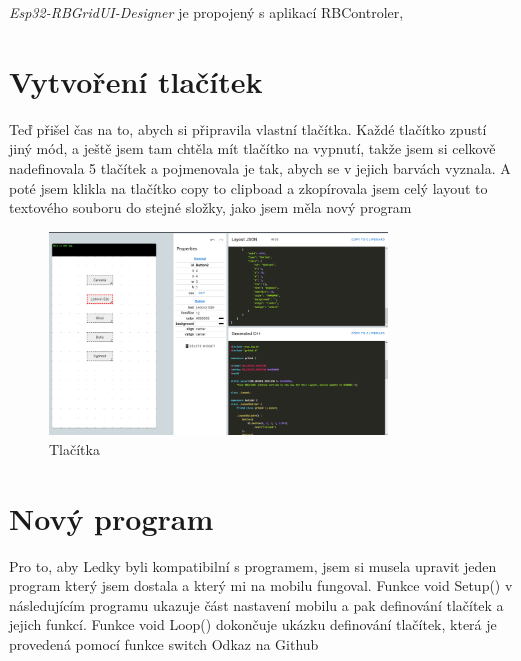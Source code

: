 {\em Esp32-RBGridUI-Designer} je propojený s aplikací RBControler, %

\section{Vytvoření tlačítek}
Teď přišel čas na to, abych si připravila vlastní tlačítka. Každé tlačítko zpustí jiný mód, a ještě jsem tam chtěla mít tlačítko na vypnutí, takže jsem si celkově nadefinovala 5 tlačítek a pojmenovala je tak, abych se v jejich barvách vyznala. A poté jsem klikla na tlačítko copy to clipboad a zkopírovala jsem celý layout to textového souboru do stejné složky, jako jsem měla nový program  


\begin{figure}[htbp]
	\centering
	\includegraphics[width=0.8\textwidth]{img/Esp32-RBGridUI-Designer - Tlačítka.png}
	\caption{Tlačítka}
\end{figure}

\section{Nový program} %
Pro to, aby Ledky byli kompatibilní s programem, jsem si musela upravit jeden program který jsem dostala a který mi na mobilu fungoval. %
Funkce void Setup() v následujícím programu ukazuje část nastavení mobilu a pak definování tlačítek a jejich funkcí. Funkce void Loop() dokončuje ukázku definování tlačítek, která je provedená pomocí funkce switch
Odkaz na Github








\newpage
